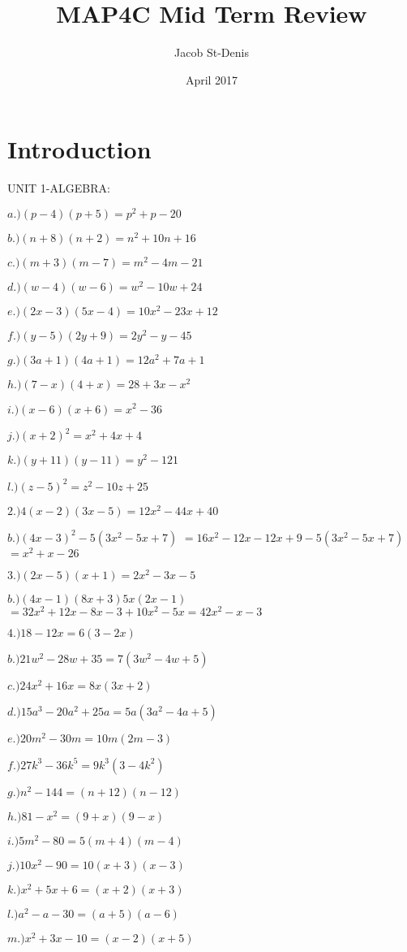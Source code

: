 \documentclass{article}
\title{MAP4C Mid Term Review}
\author{Jacob St-Denis }
\date{April 2017}
\begin{document}
\maketitle

\section{Introduction}
UNIT 1-ALGEBRA:

$a.)(p-4)(p+5)=p^2+p-20$

$b.)(n+8)(n+2)=n^2+10n+16$

$c.)(m+3)(m-7)=m^2-4m-21$

$d.)(w-4)(w-6)=w^2-10w+24$

$e.)(2x-3)(5x-4)=10x^2-23x+12$

$f.)(y-5)(2y+9)=2y^2-y-45$

$g.)(3a+1)(4a+1)=12a^2+7a+1$

$h.)(7-x)(4+x)=28+3x-x^2$

$i.)(x-6)(x+6)=x^2-36$

$j.)(x+2)^2=x^2+4x+4$

$k.)(y+11)(y-11)=y^2-121$

$l.)(z-5)^2=z^2-10z+25$\newline

$2.)4(x-2)(3x-5)=12x^2-44x+40$

$b.)(4x-3)^2-5(3x^2-5x+7)$
  $=16x^2-12x-12x+9-5(3x^2-5x+7)$$=x^2+x-26$\newline
  
$3.)(2x-5)(x+1)=2x^2-3x-5$

$b.)(4x-1)(8x+3) 5x(2x-1)$
  $=32x^2+12x-8x-3+10x^2-5x=42x^2-x-3$\newline
  
$4.)18-12x=6(3-2x)$

$b.)21w^2-28w+35=7(3w^2-4w+5)$

$c.)24x^2+16x=8x(3x+2)$

$d.)15a^3-20a^2+25a=5a(3a^2-4a+5)$

$e.)20m^2-30m=10m(2m-3)$

$f.)27k^3-36k^5=9k^3(3-4k^2)$

$g.)n^2-144=(n+12)(n-12)$

$h.)81-x^2=(9+x)(9-x)$

$i.)5m^2-80=5(m+4)(m-4)$

$j.)10x^2-90=10(x+3)(x-3)$

$k.)x^2+5x+6=(x+2)(x+3)$

$l.)a^2-a-30=(a+5)(a-6)$

$m.)x^2+3x-10=(x-2)(x+5)$
\end{document}
